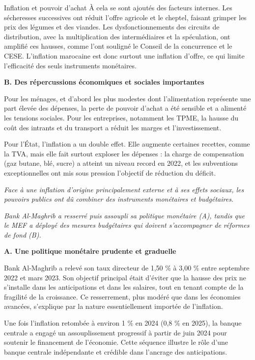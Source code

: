 \begin{copiemodele}{Inflation et pouvoir d'achat}
À cela se sont ajoutés des facteurs internes. Les sécheresses successives ont réduit l'offre agricole et le cheptel, faisant grimper les prix des légumes et des viandes. Les dysfonctionnements des circuits de distribution, avec la multiplication des intermédiaires et la spéculation, ont amplifié ces hausses, comme l'ont souligné le Conseil de la concurrence et le CESE. L'inflation marocaine est donc surtout une inflation d'offre, ce qui limite l'efficacité des seuls instruments monétaires.

\textbf{B. Des répercussions économiques et sociales importantes}

Pour les ménages, et d'abord les plus modestes dont l'alimentation représente une part élevée des dépenses, la perte de pouvoir d'achat a été sensible et a alimenté les tensions sociales. Pour les entreprises, notamment les TPME, la hausse du coût des intrants et du transport a réduit les marges et l'investissement.

Pour l'État, l'inflation a un double effet. Elle augmente certaines recettes, comme la TVA, mais elle fait surtout exploser les dépenses : la charge de compensation (gaz butane, blé, sucre) a atteint un niveau record en 2022, et les subventions exceptionnelles ont mis sous pression l'objectif de réduction du déficit.

\textit{Face à une inflation d'origine principalement externe et à ses effets sociaux, les pouvoirs publics ont dû combiner des instruments monétaires et budgétaires.}

\textit{Bank Al-Maghrib a resserré puis assoupli sa politique monétaire (A), tandis que le MEF a déployé des mesures budgétaires qui doivent s'accompagner de réformes de fond (B).}

\textbf{A. Une politique monétaire prudente et graduelle}

Bank Al-Maghrib a relevé son taux directeur de 1,50 \% à 3,00 \% entre septembre 2022 et mars 2023. Son objectif principal était d'éviter que la hausse des prix ne s'installe dans les anticipations et dans les salaires, tout en tenant compte de la fragilité de la croissance. Ce resserrement, plus modéré que dans les économies avancées, s'explique par la nature essentiellement importée de l'inflation.

Une fois l'inflation retombée à environ 1 \% en 2024 (0,8 \% en 2025), la banque centrale a engagé un assouplissement progressif à partir de juin 2024 pour soutenir le financement de l'économie. Cette séquence illustre le rôle d'une banque centrale indépendante et crédible dans l'ancrage des anticipations.


\end{copiemodele}
